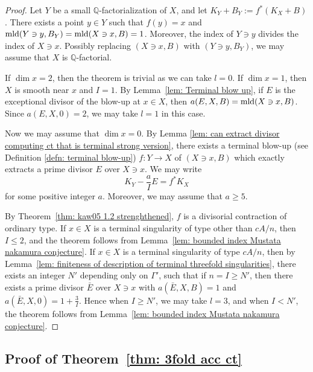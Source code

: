 \documentclass[11pt]{amsart}
\numberwithin{equation}{section}
\newcommand{\Qq}{\mathbb{Q}}
\newcommand{\mld}{{\rm{mld}}}
\newcommand{\Ii}{{\Gamma}}
\theoremstyle{definition}
\theoremstyle{definition}
\begin{document}
\begin{proof}
Let $Y$ be a small $\Qq$-factorialization of $X$, and let $K_Y+B_Y:=f^*(K_X+B)$. There exists a point $y\in Y$ such that $f(y)=x$ and $\mld(Y\ni y,B_Y)=\mld(X\ni x, B)=1$. Moreover, the index of $Y\ni y$ divides the index of $X\ni x$. Possibly replacing $(X\ni x, B)$ with $(Y\ni y, B_Y)$, we may assume that $X$ is $\Qq$-factorial.

If $\dim x=2$, then the theorem is trivial as we can take $l=0$. If $\dim x=1$, then $X$ is smooth near $x$ and $I=1$. By Lemma~\ref{lem: Terminal blow up}, if $E$ is the exceptional divisor of the blow-up at $x\in X$, then $a(E,X,B)=\mld(X\ni x, B)$. Since $a(E,X,0)=2$, we may take $l=1$ in this case. 

Now we may assume that $\dim x=0$. By Lemma \ref{lem: can extract divisor computing ct that is terminal strong version}, there exists a terminal blow-up (see Definition \ref{defn: terminal blow-up}) $f: Y\to X$ of $(X\ni x,B)$ which exactly extracts a prime divisor $E$ over $X\ni x$. We may write $$K_Y-\frac{a}{I}E=f^*K_X$$
for some positive integer $a$. Moreover, we may assume that $a\geq 5$.
 
By Theorem~\ref{thm: kaw05 1.2 strenghthened}, $f$ is a divisorial contraction of ordinary type. If $x\in X$ is a terminal singularity of type other than $cA/n$, then $I\leq 2$, and the theorem follows from Lemma~\ref{lem: bounded index Mustata nakamura conjecture}. If $x\in X$ is a terminal singularity of type $cA/n$, then by Lemma~\ref{lem: finiteness of description of terminal threefold singularities}, there exists an integer $N'$ depending only on $\Ii'$, such that if $n=I\geq N'$, then there exists a prime divisor $\bar E$ over $X\ni x$ with $a(\bar E,X,B)=1$ and $a(\bar E,X,0)=1+\frac{3}{I}$. Hence when $I\geq N'$, we may take $l=3$, and when $I<N'$, the theorem follows from Lemma~\ref{lem: bounded index Mustata nakamura conjecture}.
\end{proof}



\subsection{Proof of Theorem~\ref{thm: 3fold acc ct}}
\end{document}
